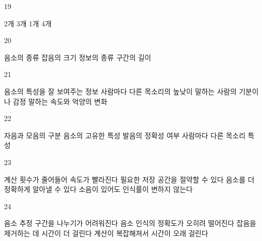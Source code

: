 \documentclass[fs9,seriesRus]{korfarm-base}
\begin{document}
\begin{kfSentenceUnit}{19}{}
\begin{kfChoices}
\kfChoice 2개
\kfChoice 3개
\kfChoice 1개
\kfChoice 4개
\end{kfChoices}
\end{kfSentenceUnit}

\begin{kfSentenceUnit}{20}{}
\begin{kfChoices}
\kfChoice 음소의 종류
\kfChoice 잡음의 크기
\kfChoice 정보의 종류
\kfChoice 구간의 길이
\end{kfChoices}
\end{kfSentenceUnit}

\begin{kfSentenceUnit}{21}{}
\begin{kfChoices}
\kfChoice 음소의 특성을 잘 보여주는 정보
\kfChoice 사람마다 다른 목소리의 높낮이
\kfChoice 말하는 사람의 기분이나 감정
\kfChoice 말하는 속도와 억양의 변화
\end{kfChoices}
\end{kfSentenceUnit}

\begin{kfSentenceUnit}{22}{}
\begin{kfChoices}
\kfChoice 자음과 모음의 구분
\kfChoice 음소의 고유한 특성
\kfChoice 발음의 정확성 여부
\kfChoice 사람마다 다른 목소리 특성
\end{kfChoices}
\end{kfSentenceUnit}

\begin{kfSentenceUnit}{23}{}
\begin{kfChoices}
\kfChoice 계산 횟수가 줄어들어 속도가 빨라진다
\kfChoice 필요한 저장 공간을 절약할 수 있다
\kfChoice 음소를 더 정확하게 알아낼 수 있다
\kfChoice 소음이 있어도 인식률이 변하지 않는다
\end{kfChoices}
\end{kfSentenceUnit}

\begin{kfSentenceUnit}{24}{}
\begin{kfChoices}
\kfChoice 음소 추정 구간을 나누기가 어려워진다
\kfChoice 음소 인식의 정확도가 오히려 떨어진다
\kfChoice 잡음을 제거하는 데 시간이 더 걸린다
\kfChoice 계산이 복잡해져서 시간이 오래 걸린다
\end{kfChoices}
\end{kfSentenceUnit}
\end{document}
